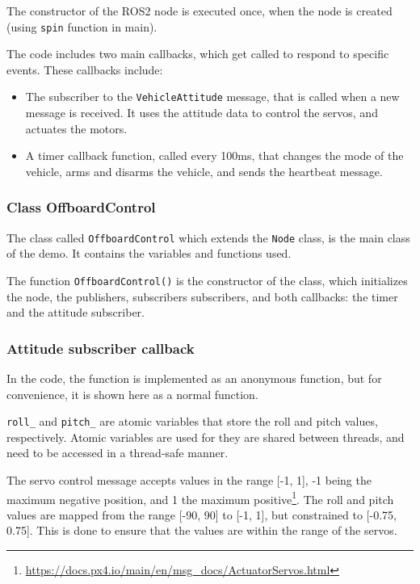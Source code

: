 \documentclass[a4paper]{article}
\begin{document}
The constructor of the ROS2 node is executed once, when the node is created (using \verb|spin| function in main). 

The code includes two main callbacks, which get called to respond to specific events. These callbacks include: 
\begin{itemize}
    \item The subscriber to the \verb|VehicleAttitude| message, that is called when a new message is received. It uses the attitude data to control the servos, and actuates the motors. 
    \item A timer callback function, called every 100ms, that changes the mode of the vehicle, arms and disarms the vehicle, and sends the heartbeat message. 
\end{itemize}

\subsubsection{Class OffboardControl}

The class called \verb|OffboardControl| which extends the \verb|Node| class, is the main class of the demo. 
It contains the variables and functions used. 

The function \verb|OffboardControl()| is the constructor of the class, which initializes the node, the publishers, subscribers subscribers, and both callbacks: the timer and the attitude subscriber.



\subsubsection{Attitude subscriber callback}

In the code, the function is implemented as an anonymous function, but for convenience, it is shown here as a normal function.



\verb|roll_| and \verb|pitch_| are atomic variables that store the roll and pitch values, respectively. 
Atomic variables are used for they are shared between threads, and need to be accessed in a thread-safe manner. 

The servo control message accepts values in the range [-1, 1], -1 being the maximum negative position, and 1 the maximum positive\footnote{\url{https://docs.px4.io/main/en/msg_docs/ActuatorServos.html}}. 
The roll and pitch values are mapped from the range [-90, 90] to [-1, 1], but constrained to [-0.75, 0.75]. 
This is done to ensure that the values are within the range of the servos. \\
\end{document}
